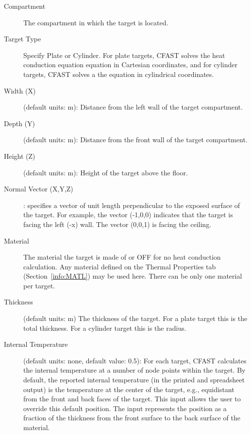 {{\begin{description}
\item[Compartment] The compartment in which the target is located.

\item[Target Type] Specify Plate or Cylinder.  For plate targets, CFAST solves the heat conduction equation equation in Cartesian coordinates, and for cylinder targets, CFAST solves a the equation in cylindrical coordinates.

\item[Width (X)] (default units: \unit{m}): Distance from the left wall of the target compartment.

\item[Depth (Y)] (default units: \unit{m}): Distance from the front wall of the target compartment.

\item[Height (Z)] (default units: \unit{m}): Height of the target above the floor.

\item[Normal Vector (X,Y,Z)]: specifies a vector of unit length perpendicular to the exposed surface of the target. For example, the vector (-1,0,0) indicates that the target is facing the left (-x) wall. The vector (0,0,1) is facing the ceiling.

\item[Material] The material the target is made of or OFF for no heat conduction calculation. Any material defined on the Thermal Properties tab (Section~\ref{info:MATL}) may be used here. There can be only one material per target.

\item[Thickness] (default units: \unit{m}) The thickness of the target. For a plate target this is the total thickness. For a cylinder target this is the radius.

\item[Internal Temperature] (default units: none, default value: 0.5): For each target, CFAST calculates the internal temperature at a number of node points within the target. By default, the reported internal temperature (in the printed and spreadsheet output) is the temperature at the center of the target, e.g., equidistant from the front and back faces of the target. This input allows the user to override this default position. The input represents the position as a fraction of the thickness from the front surface to the back surface of the material.
\end{description}


}}
